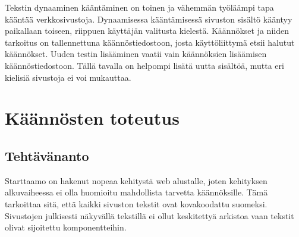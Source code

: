 \documentclass[11pt,a4paper,titlepage,oneside]{article}
\begin{document}

Tekstin dynaaminen kääntäminen on toinen ja vähemmän työläämpi tapa kääntää verkkosivustoja.
Dynaamisessa kääntämisessä sivuston sisältö kääntyy paikallaan toiseen, riippuen käyttäjän valitusta kielestä.
Käännökset ja niiden tarkoitus on tallennettuna käännöstiedostoon, 
josta käyttöliittymä etsii halutut käännökset.\citemissing
Uuden testin lisääminen vaatii vain käännöksien lisäämisen käännöstiedostoon.
Tällä tavalla on helpompi lisätä uutta sisältöä, mutta eri kielisiä sivustoja ei voi mukauttaa.
\medskip

































\newpage






\section{Käännösten toteutus}




\subsection{Tehtävänanto}


Starttaamo on hakenut nopeaa kehitystä web alustalle, joten kehityksen alkuvaiheessa 
ei olla huomioitu mahdollista tarvetta käännöksille. 
Tämä tarkoittaa sitä, että kaikki sivuston tekstit ovat kovakoodattu suomeksi.
Sivustojen julkisesti näkyvällä tekstillä ei ollut keskitettyä arkistoa vaan tekstit olivat sijoitettu komponentteihin.
\medskip
\end{document}

